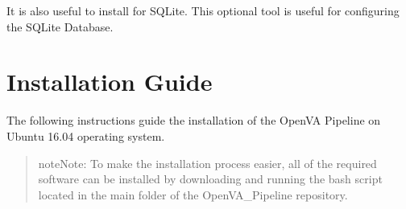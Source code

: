 \documentclass[letterpaper,12pt,english]{sphinxmanual}
\begin{document}
It is also useful to install   for SQLite.  This
optional tool is useful for configuring the SQLite Database.


\chapter{Installation Guide}
\label{\detokenize{install:installation-guide}}\label{\detokenize{install::doc}}
The following instructions guide the installation of the OpenVA Pipeline on Ubuntu 16.04 operating system.
\begin{quote}

\begin{sphinxadmonition}{note}{Note:}
To make the installation process easier, all of the required software can be installed by downloading and running the bash script  located in the main folder of the OpenVA\_Pipeline repository.
\end{sphinxadmonition}
\end{quote}
\end{document}
